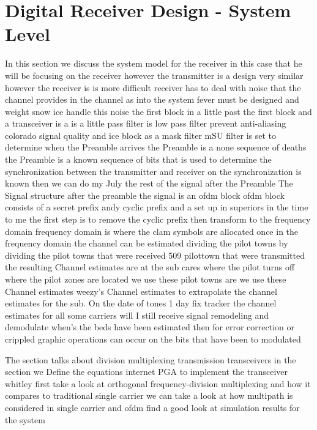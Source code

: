 \documentclass[]{book}
\begin{document}
\section{Digital Receiver Design - System Level}
In this section we discuss the system model for the receiver in this case that he will be focusing on the receiver however the transmitter is a design very similar however the receiver is is more difficult receiver has to deal with noise that the channel provides in the channel as into the system fever must be designed and weight snow ice handle this noise the first block in a little past the first block and a transceiver is a is a little pass filter is low pass filter prevent anti-aliasing colorado signal quality and ice block as a mask filter mSU filter is set to determine when the Preamble arrives the Preamble is a none sequence of deaths the Preamble is a known sequence of bits that is used to determine the synchronization between the transmitter and receiver on the synchronization is known then we can do my July the rest of the signal after the Preamble The Signal structure after the preamble the signal is an ofdm block ofdm block consists of a secret prefix andy cyclic prefix and a set up in superiors in the time to me the first step is to remove the cyclic prefix then transform to the frequency domain frequency domain is where the clam symbols are allocated once in the frequency domain the channel can be estimated dividing the pilot towns by dividing the pilot towns that were received 509 pilottown that were transmitted the resulting Channel estimates are at the sub cares where the pilot turns off where the pilot zones are located we use these pilot towns are we use these Channel estimates weezy's Channel estimates to extrapolate the channel estimates for the sub. On the date of tones 1 day fix tracker the channel estimates for all some carriers will I still receive signal remodeling and demodulate when's the beds have been estimated then for error correction or crippled graphic operations can occur on the bits that have been to modulated

The section talks about division multiplexing transmission transceivers in the section we Define the equations internet PGA to implement the transceiver whitley first take a look at orthogonal frequency-division multiplexing and how it compares to traditional single carrier we can take a look at how multipath is considered in single carrier and ofdm find a good look at simulation results for the system
\end{document}
